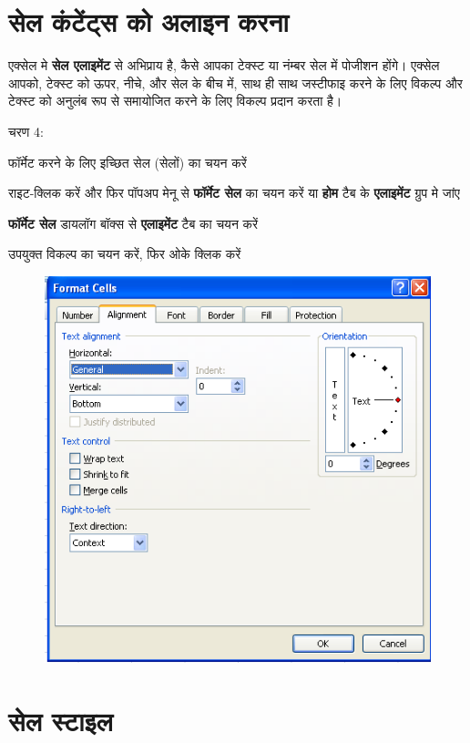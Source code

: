\section{सेल कंटेंट्स को अलाइन करना}\label{id-2.9}

एक्सेल मे \textbf{सेल एलाइमेंट} से अभिप्राय है, कैसे आपका टेक्स्ट या नंम्बर सेल में पोजीशन होंगे। एक्सेल आपको, टेक्स्ट को ऊपर, नीचे, और सेल के बीच में, साथ ही साथ जस्टीफाइ करने के लिए विकल्प और टेक्स्ट को अनुलंब रूप से समायोजित करने के लिए विकल्प प्रदान करता है।

\begin{descriptionSimple}{चरण 4:}
\item[चरण 1] फॉर्मेट करने के लिए इच्छित सेल (सेलों) का चयन करें
\item[चरण 2] राइट-क्लिक करें और फिर पॉपअप मेनू से \textbf{फॉर्मेट सेल} का चयन करें या \textbf{होम} टैब के \textbf{एलाइमेंट} ग्रुप मे जांए
\item[चरण 3] \textbf{फॉर्मेट सेल} डायलॉग बॉक्स से \textbf{एलाइमेंट} टैब का चयन करें
\item[चरण 4] उपयुक्त विकल्प का चयन करें, फिर ओके क्लिक करें
\end{descriptionSimple}

\begin{figure}[H]
\centering
\includegraphics[scale=.62]{src/images/chapter2/chapter2_fig17.png}
\end{figure}


\section{सेल स्टाइल}\label{id-2.10}

